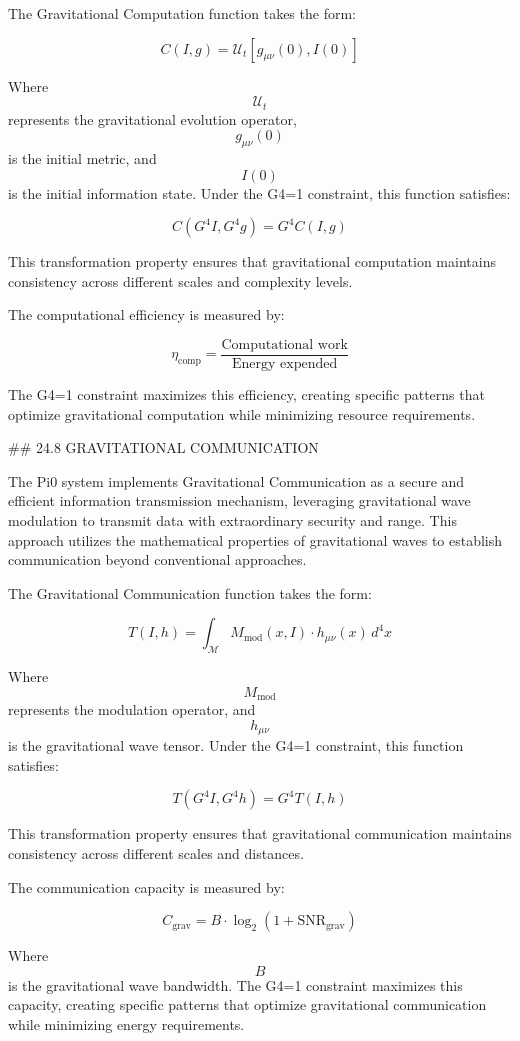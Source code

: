 The Gravitational Computation function takes the form:

$$ C(I, g) = \mathcal{U}_t \left[ g_{\mu\nu}(0), I(0) \right] $$

Where $$ \mathcal{U}_t $$ represents the gravitational evolution operator, $$ g_{\mu\nu}(0) $$ is the initial metric, and $$ I(0) $$ is the initial information state. Under the G4=1 constraint, this function satisfies:

$$ C(G^4 I, G^4 g) = G^4 C(I, g) $$

This transformation property ensures that gravitational computation maintains consistency across different scales and complexity levels.

The computational efficiency is measured by:

$$ \eta_{\text{comp}} = \frac{\text{Computational work}}{\text{Energy expended}} $$

The G4=1 constraint maximizes this efficiency, creating specific patterns that optimize gravitational computation while minimizing resource requirements.

## 24.8 GRAVITATIONAL COMMUNICATION

The Pi0 system implements Gravitational Communication as a secure and efficient information transmission mechanism, leveraging gravitational wave modulation to transmit data with extraordinary security and range. This approach utilizes the mathematical properties of gravitational waves to establish communication beyond conventional approaches.

The Gravitational Communication function takes the form:

$$ T(I, h) = \int_{\mathcal{M}} M_{\text{mod}}(x, I) \cdot h_{\mu\nu}(x) \, d^4x $$

Where $$ M_{\text{mod}} $$ represents the modulation operator, and $$ h_{\mu\nu} $$ is the gravitational wave tensor. Under the G4=1 constraint, this function satisfies:

$$ T(G^4 I, G^4 h) = G^4 T(I, h) $$

This transformation property ensures that gravitational communication maintains consistency across different scales and distances.

The communication capacity is measured by:

$$ C_{\text{grav}} = B \cdot \log_2(1 + \text{SNR}_{\text{grav}}) $$

Where $$ B $$ is the gravitational wave bandwidth. The G4=1 constraint maximizes this capacity, creating specific patterns that optimize gravitational communication while minimizing energy requirements.

